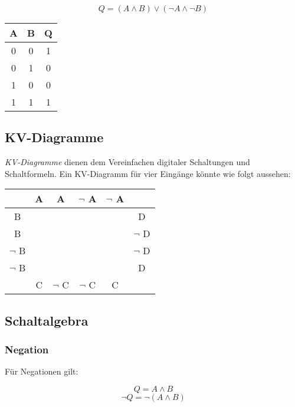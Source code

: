 \documentclass[a4paper, 12pt]{report}
\begin{document}
\begin{center}
	\begin{equation}
		Q = (A \land B) \lor (\neg A \land \neg B)
	\end{equation}
   \begin{tabular}{ | c | c || c | }
    	\hline
    	A & B & Q \\ \hline
    	0 & 0 & 1 \\ \hline
    	0 & 1 & 0 \\ \hline
    	1 & 0 & 0 \\ \hline
    	1 & 1 & 1 \\ 
    	\hline
    \end{tabular}
\end{center}

\subsection{KV-Diagramme}

\emph{KV-Diagramme} dienen dem Vereinfachen digitaler Schaltungen und 
Schaltformeln. Ein KV-Diagramm für vier Eingänge könnte wie folgt aussehen: 

\begin{center}
    \begin{tabular}{ | c | c | c | c | c | c | }
        \hline 
         & A & A & $\neg$ A & $\neg$ A &  \\ \hline
        B & & & & & D \\ \hline
        B & & & & & $\neg$ D \\ \hline
        $\neg$ B & & & & & $\neg$ D \\ \hline
        $\neg$ B & & & & & D \\ \hline
         & C & $\neg$ C & $\neg$ C & C &  \\
        \hline
    \end{tabular}
\end{center}


\newpage
\subsection{Schaltalgebra}

\subsubsection{Negation}

Für Negationen gilt: 

\begin{center}
    \begin{equation}
        Q = A \land B
    \end{equation}
    \begin{equation}
        \neg Q = \neg (A \land B)
    \end{equation}
\end{center}
\end{document}
